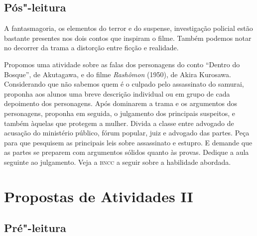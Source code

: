 \documentclass[12pt]{extarticle}
\begin{document}

\subsection{Pós"-leitura}




A fantasmagoria, os elementos do terror e do suspense, investigação policial
estão bastante presentes nos dois contos que inspiram o filme.
Também podemos notar no decorrer da trama a distorção entre ficção e realidade. 

Propomos uma atividade sobre as falas dos personagens do conto  ``Dentro do Bosque'', de Akutagawa, 
e do filme \emph{Rashômon} (1950), de Akira Kurosawa. 
Considerando que não sabemos quem é o culpado pelo assassinato do samurai, 
proponha aos alunos uma breve descrição
individual ou em grupo de cada depoimento dos personagens. Após dominarem 
a trama e os argumentos dos personagens, proponha em seguida, o julgamento dos 
principais suspeitos, e também àquelas que protegem a mulher. Divida a classe
entre advogado de acusação do ministério público, fórum popular, juiz e advogado das partes.
Peça para que pesquisem as principais leis sobre assassinato e estupro. E demande
que as partes se preparem com argumentos sólidos quanto às provas. Dedique a aula seguinte 
ao julgamento. 
Veja a \textsc{bncc} a seguir sobre a habilidade abordada. 



\section{Propostas de Atividades II}





\subsection{Pré"-leitura}
\end{document}
